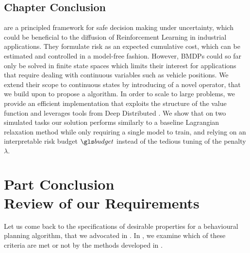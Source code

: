 \section*{Chapter Conclusion}
\label{sec:conclusion}
 are a principled framework for safe decision making under uncertainty, which could be beneficial to the diffusion of Reinforcement Learning in industrial applications. They formulate risk as an expected cumulative cost, which can be estimated and controlled in a model-free fashion. However, \glspl{BMDP} could so far only be solved in finite state spaces which limits their interest for  applications that require dealing with continuous variables such as vehicle positions. We extend their scope to continuous states by introducing of a novel  operator, that we build upon to propose a  algorithm. In order to scale to large problems, we provide an efficient implementation that exploits the structure of the value function and leverages tools from Deep Distributed . We show that on two simulated tasks our solution performs similarly to a baseline Lagrangian relaxation method while only requiring a single model to train, and relying on an interpretable risk budget $\budget$ instead of the tedious tuning of the penalty $\lambda$.

%
%


\chapter*{Part Conclusion\\ {\LARGE Review of our Requirements}}

Let us come back to the specifications of desirable properties for a behavioural planning algorithm, that we advocated in . In , we examine which of these criteria are met or not by the methods developed in .

